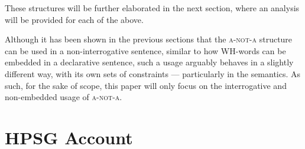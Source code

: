 \documentclass[12pt, UTF8]{article}
\begin{document}
These structures will be further elaborated in the next section, where an analysis will be provided for each of the above.

Although it has been shown in the previous sections that the \textsc{a-not-a} structure can be used in a non-interrogative sentence, similar to how WH-words can be embedded in a declarative sentence, such a usage arguably behaves in a slightly different way, with its own sets of constraints --- particularly in the semantics. As such, for the sake of scope, this paper will only focus on the interrogative and non-embedded usage of \textsc{a-not-a}.

\newpage

\section{HPSG Account}
\end{document}
